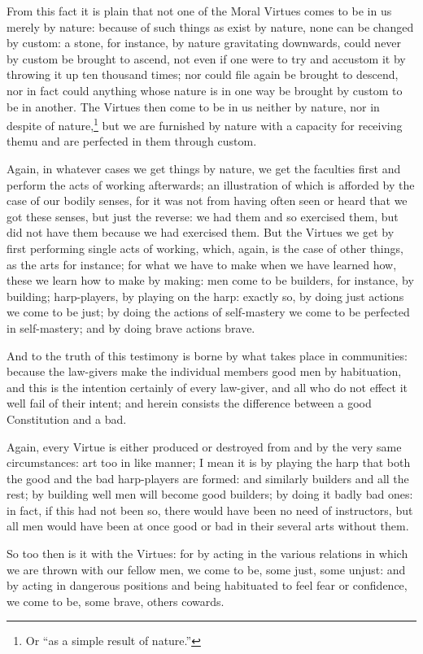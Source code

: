 From this fact it is plain that not one of the Moral Virtues comes to be in us
merely by nature: because of such things as exist by nature, none can be
changed by custom: a stone, for instance, by nature gravitating downwards,
could never by custom be brought to ascend, not even if one were to try and
accustom it by throwing it up ten thousand times; nor could file again be
brought to descend, nor in fact could anything whose nature is in one way be
brought by custom to be in another. The Virtues then come to be in us neither
by nature, nor in despite of nature,\footnote{Or “as a simple result of nature.”}
but we are furnished by nature with a capacity for receiving themu and are
perfected in them through custom.

Again, in whatever cases we get things by nature, we get the faculties first
and perform the acts of working afterwards; an illustration of which is
afforded by the case of our bodily senses, for it was not from having often
seen or heard that we got these senses, but just the reverse: we had them and
so exercised them, but did not have them because we had exercised them. But the
Virtues we get by first performing single acts of working, which, again, is the
case of other things, as the arts for instance; for what we have to make when
we have learned how, these we learn how to make by making: men come to be
builders, for instance, by building; harp-players, by playing on the harp:
exactly so, by doing just actions we come to be just; by doing the actions of
self-mastery we come to be perfected in self-mastery; and by doing brave
actions brave.

And to the truth of this testimony is borne by what takes place in communities:
because the law-givers make the individual members good men by habituation, and
this is the intention certainly of every law-giver, and all who do not effect
it well fail of their intent; and herein consists the difference between a good
Constitution and a bad.

Again, every Virtue is either produced or destroyed from and by the very same
circumstances: art too in like manner; I mean it is by playing the harp that
both the good and the bad harp-players are formed: and similarly builders and
all the rest; by building well men will become good builders; by doing it badly
bad ones: in fact, if this had not been so, there would have been no need of
instructors, but all men would have been at once good or bad in their several
arts without them.

So too then is it with the Virtues: for by acting in the various relations in
which we are thrown with our fellow men, we come to be, some just, some unjust:
and by acting in dangerous positions and being habituated to feel fear or
confidence, we come to be, some brave, others cowards.


